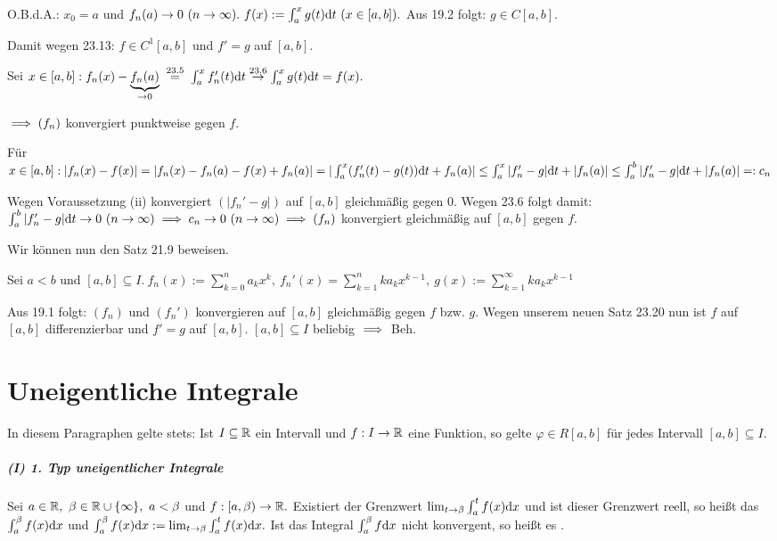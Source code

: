 \documentclass[a4paper,twoside,DIV15,BCOR12mm]{scrbook}
\begin{document}
\newcommand{\gehtwegen}[1]{\overset{#1}{\to}}
\newcommand{\gehtnach}[1]{\overset{\text{#1}}{\to}}

\begin{beweis}
O.B.d.A.: $x_0=a$ und $f_n(a) \to 0\ (n \to \infty).\ f(x):=\int_a^x g(t)\dt\ (x \in [a,b]).$ Aus 19.2 folgt: $g \in C[a,b].$

Damit wegen 23.13: $f \in C^1[a,b]$ und $f'=g$ auf $[a,b].$

Sei $x \in [a,b]: f_n(x) - \underbrace{f_n(a)}_{\to 0} \gleichnach{23.5} \int_a^x f_n'(t)\dt \gehtnach{23.6} \int_a^x g(t)\dt = f(x).$

$\implies (f_n)$ konvergiert punktweise gegen $f$.

Für $x \in [a,b]: |f_n(x)-f(x)| = |f_n(x)-f_n(a)-f(x)+f_n(a)| = |\int_a^x (f_n'(t)-g(t))\text{d}t + f_n(a)| \le \int_a^x |f_n'-g|\text{d}t + |f_n(a)| \le \int_a^b |f_n'-g|\text{d}t + |f_n(a)| =: c_n$

Wegen Voraussetzung (ii) konvergiert $(|f_n'-g|)$ auf $[a,b]$ gleichmäßig gegen $0$. Wegen 23.6 folgt damit: $\int_a^b |f_n'-g| \text{d}t \to 0\ (n \to \infty) \implies c_n \to 0\ (n \to \infty) \implies (f_n)$ konvergiert gleichmäßig auf $[a,b]$ gegen $f$.
\end{beweis}

Wir können nun den Satz 21.9 beweisen.

\begin{beweis}
Sei $a<b$ und $[a,b] \subseteq I.\ f_n(x) := \sum_{k=0}^n a_k x^k,\ f_n'(x) = \sum_{k=1}^n ka_kx^{k-1},\ g(x) := \sum_{k=1}^\infty ka_kx^{k-1}$

Aus 19.1 folgt: $(f_n)$ und $(f_n')$ konvergieren auf $[a,b]$ gleichmäßig gegen $f$ bzw. $g$. Wegen unserem neuen Satz 23.20 nun ist $f$ auf $[a,b]$ differenzierbar und $f'=g$ auf $[a,b]$. $[a,b] \subseteq I$ beliebig $\implies$ Beh.
\end{beweis}

\chapter{Uneigentliche Integrale}

In diesem Paragraphen gelte stets: Ist $I \subseteq \mathbb{R}$ ein Intervall und $f: I \to \mathbb{R}$ eine Funktion, so gelte $\varphi \in R[a,b]$ für jedes Intervall $[a,b] \subseteq I$.

\paragraph{(I) 1. Typ uneigentlicher Integrale}
Sei $a \in \mathbb{R},\ \beta \in \mathbb{R} \cup \{\infty\},\ a<\beta$ und $f:[a,\beta) \to \mathbb{R}.$ Existiert der Grenzwert $\lim_{t\to\beta} \int_a^t f(x)\text{d}x$ und ist dieser Grenzwert reell, so heißt das  $\int_a^\beta f(x)\text{d}x$  und $\int_a^\beta f(x)\text{d}x := \lim_{t\to\beta} \int_a^t f(x)\text{d}x.$ Ist das Integral $\int_a^\beta f\text{d}x$ nicht konvergent, so heißt es .
\end{document}
